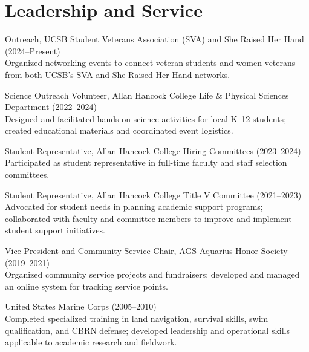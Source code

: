 \documentclass[letterpaper]{article}
\newenvironment{biblist}{%
   \begin{list}{}{%
     \setlength{\labelwidth}{0pt}%
     \setlength{\labelsep}{1em}%
     \setlength{\leftmargin}{2em}%
     \setlength{\itemindent}{-1em}%
   }
}{\end{list}}
\begin{document}
\section*{Leadership and Service}

\begin{biblist}

\item Outreach, UCSB Student Veterans Association (SVA) and She Raised Her Hand (2024--Present)\\
Organized networking events to connect veteran students and women veterans from both UCSB’s SVA and She Raised Her Hand networks.

\item Science Outreach Volunteer, Allan Hancock College Life \& Physical Sciences Department (2022--2024)\\
Designed and facilitated hands-on science activities for local K--12 students; created educational materials and coordinated event logistics.

\item Student Representative, Allan Hancock College Hiring Committees (2023--2024)\\
Participated as student representative in full-time faculty and staff selection committees.

\item Student Representative, Allan Hancock College Title V Committee (2021--2023)\\
Advocated for student needs in planning academic support programs; collaborated with faculty and committee members to improve and implement student support initiatives.

\item Vice President and Community Service Chair, AGS Aquarius Honor Society (2019--2021)\\
Organized community service projects and fundraisers; developed and managed an online system for tracking service points.

\item United States Marine Corps (2005--2010)\\
Completed specialized training in land navigation, survival skills, swim qualification, and CBRN defense; developed leadership and operational skills applicable to academic research and fieldwork.

\end{biblist}
\end{document}
